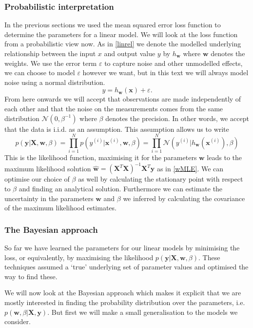 \documentclass[english]{article}
\renewcommand{\epsilon}{\varepsilon}
\begin{document}
\subsubsection{Probabilistic interpretation}
In the previous sections we used the mean squared error loss function to determine the parameters for a linear model. We will look at the loss function from a probabilistic view now. As in \ref{linrel} we denote the modelled underlying relationship between the input $x$ and output value $y$ by $h_{\textbf{w}}$ where $\textbf{w}$ denotes the weights. We use the error term $\epsilon$ to capture noise and other unmodelled effects, we can choose to model $\epsilon$ however we want, but in this text we will always model noise using a normal distribution.
\begin{equation}
	y = h_{\textbf{w}}(\textbf{x})+\epsilon.
\end{equation}
From here onwards we will accept that observations are made independently of each other and that the noise on the measurements comes from the same distribution $\mathcal{N}(0,\beta^{-1})$ where $\beta$ denotes the precision. In other words, we accept that the data is i.i.d. as an assumption. This assumption allows us to write
\begin{equation}
	p(\textbf{y}|\textbf{X},\textbf{w},\beta) = \prod_{i=1}^{N}p(y^{(i)}|\textbf{x}^{(i)}, \textbf{w}, \beta) = \prod_{i=1}^N\mathcal{N}\left(y^{(i)}|h_\textbf{w}(\textbf{x}^{(i)}), \beta \right)
\end{equation}
This is the likelihood function, maximising it for the parameters $\textbf{w}$ leads to the maximum likelihood solution $\hat{\textbf{w}} = (\textbf{X}^T\textbf{X})^{-1}\textbf{X}^T\textbf{y}$ as in \ref{wMLE}. We can optimise our choice of $\beta$ as well by calculating the stationary point with respect to $\beta$ and finding an analytical solution. Furthermore we can estimate the uncertainty in the parameters $\textbf{w}$ and $\beta$ we inferred by calculating the covariance of the maximum likelihood estimates.
\subsubsection{The Bayesian approach} 
So far we have learned the parameters for our linear models by minimising the loss, or equivalently, by maximising the likelihood $p(\textbf{y}|\textbf{X},\textbf{w},\beta)$. These techniques assumed a `true' underlying set of parameter values and optimised the way to find these. 

We will now look at the Bayesian approach which makes it explicit that we are mostly interested in finding the probability distribution over the parameters, i.e. $p(\textbf{w}, \beta|\textbf{X},\textbf{y})$. But first we will make a small generalisation to the models we consider.
\end{document}
